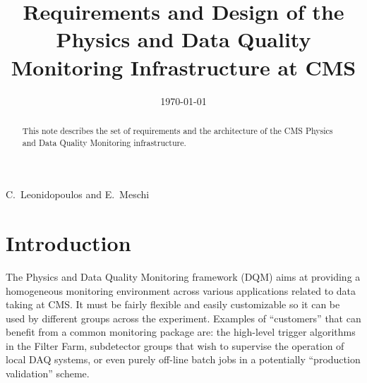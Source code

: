 \documentclass[a4paper]{cmspaper}
\newcommand{\pdfbookmark}[3][1]{}
\begin{document}

\begin{titlepage}

   \date{\today}
\smallskip
\smallskip


  \title{Requirements and Design of the Physics and Data Quality
Monitoring Infrastructure at CMS}

  \begin{Authlist}
    C.~Leonidopoulos and E.~Meschi
  \end{Authlist}


  \begin{abstract}
    \pdfbookmark[1]{Abstract}{Abstract}
  This note describes the set of requirements and the architecture of
the CMS Physics and Data Quality Monitoring infrastructure. 
  \end{abstract} 

  
\end{titlepage}

\setcounter{page}{2}%
\linenumbers
\section{Introduction} \label{sec:introduction}
%
The Physics and Data Quality Monitoring framework (DQM) aims at
providing a homogeneous monitoring environment across various
applications related to data taking at CMS. It must be fairly flexible
and easily customizable so it can be used by different groups across the
experiment. Examples of ``customers'' that can benefit from a common monitoring
package are: the high-level trigger algorithms in the Filter Farm,
subdetector groups that wish to supervise the operation of local DAQ
systems, or even purely off-line batch jobs in a potentially
``production validation'' scheme. 
\end{document}

